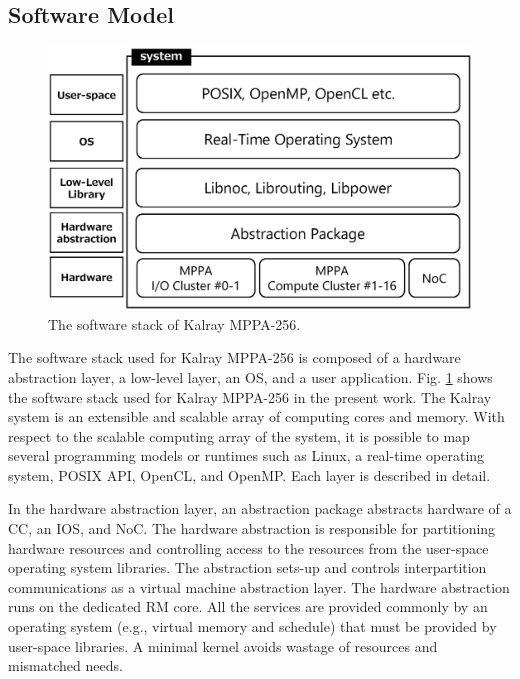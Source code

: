   \subsection{Software Model}
  \label{sec:software_model}

  \begin{figure}[t]
    \centering
    \includegraphics[width=0.9\linewidth]{../figure/softwarestack.eps}   
    \caption{\label{fig:software_stack}
      The software stack of Kalray MPPA-256.}     
  \end{figure}

  The software stack used for Kalray MPPA-256 is composed of a hardware abstraction layer, a low-level layer, an OS, and a user application.  
  Fig. \ref{fig:software_stack} shows the software stack used for Kalray MPPA-256 in the present work.
  The Kalray system is an extensible and scalable array of computing cores and memory.
  With respect to the scalable computing array of the system, it is possible to map several programming models or runtimes such as Linux, a real-time operating system, POSIX API, OpenCL, and OpenMP.
  Each layer is described in detail.
  
  In the hardware abstraction layer, an abstraction package abstracts hardware of a CC, an IOS, and NoC.
  The hardware abstraction is responsible for partitioning hardware resources and controlling access to the resources from the user-space operating system libraries.
  The abstraction sets-up and controls interpartition communications as a virtual machine abstraction layer.
  The hardware abstraction runs on the dedicated RM core.
  All the services are provided commonly by an operating system (e.g., virtual memory and schedule) that must be provided by user-space libraries.
  A minimal kernel avoids wastage of resources and mismatched needs.
  
